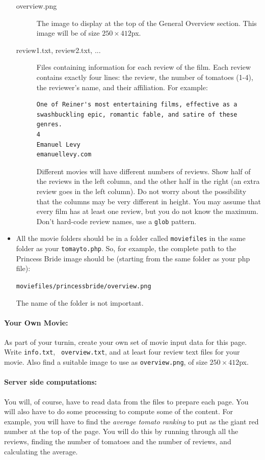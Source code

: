 \documentclass{article}
\begin{document}
\begin{itemize}
\begin{description}
\item[overview.png] The image to display at the top of the General
  Overview section.  This image will be of size
$250\times412$px. 
\item[review1.txt, review2.txt, ...]  Files containing information for
  each review of the film.  Each review contains exactly four lines:
  the review, the number of tomatoes (1-4), the reviewer's name, and
  their affiliation.  For example:
  \begin{Verbatim}[frame=single]
One of Reiner's most entertaining films, effective as a swashbuckling epic, romantic fable, and satire of these genres.
4
Emanuel Levy
emanuellevy.com
  \end{Verbatim}
  Different movies will have different numbers of reviews.  Show half
  of the reviews in the left column, and the other half in the right
  (an extra review goes in the left column).  Do not worry about the
  possibility that the columns may be very different in height.  You
  may assume that every film has at least one review, but you do not
  know the maximum.  Don't hard-code review names, use a {\tt glob}
  pattern. 

\end{description}
\item
All the movie folders should be in a folder called {\tt moviefiles} in
the same folder as your {\tt tomayto.php}.  So, for example, the
complete path to the Princess Bride image should be (starting from the
same folder as your php file):\\
\centerline{\tt moviefiles/princessbride/overview.png}
The name of the folder is not important.
\end{itemize}

\paragraph{Your Own Movie:}
  As part of your turnin, create your own set
of movie input data for this page.  Write {\tt info.txt}, {\tt
  overview.txt}, and at least four review text files for your movie.
Also find a suitable image to use as {\tt overview.png}, of size
$250\times412$px. 



\paragraph{Server side computations:}   You will, of course, have to read
data from the files to prepare each page.  You will also have to do
some processing to compute some of the content.  For example, you will
have to find the {\em average tomato ranking} to put as the giant red
number at the top of the page.  You will do this by running through
all the reviews, finding the number of tomatoes and the number of
reviews, and calculating the average.
\end{document}
